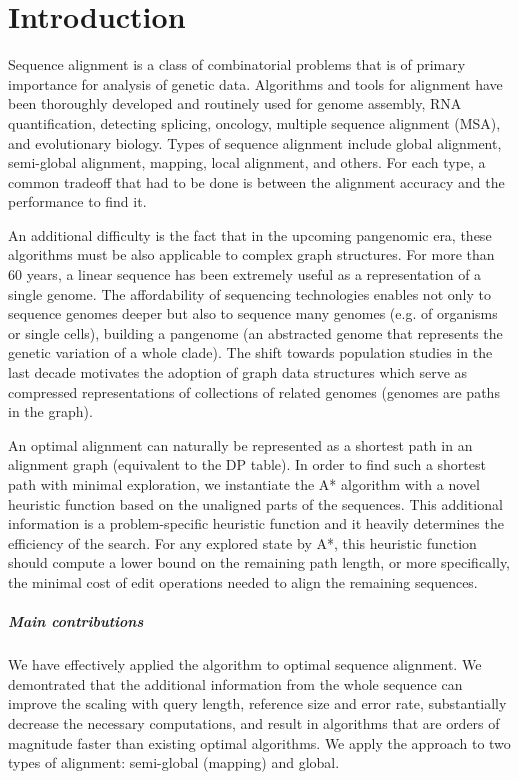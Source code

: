 \graphicspath{{\dir/}}

\chapter{Introduction} \label{ch:introduction}


Sequence alignment is a class of combinatorial problems that is of primary
importance for analysis of genetic data. Algorithms and tools for alignment have
been thoroughly developed and routinely used for genome assembly, RNA
quantification, detecting splicing, oncology, multiple sequence alignment (MSA),
and evolutionary biology. Types of sequence alignment include global alignment,
semi-global alignment, mapping, local alignment, and others. For each type, a
common tradeoff that had to be done is between the alignment accuracy and the
performance to find it.

An additional difficulty is the fact that in the
upcoming pangenomic era, these algorithms must be also applicable to complex
graph structures. For more than 60 years, a linear sequence has been extremely
useful as a representation of a single genome. The affordability of sequencing
technologies enables not only to sequence genomes deeper but also to sequence
many genomes (e.g. of organisms or single cells), building a pangenome (an
abstracted genome that represents the genetic variation of a whole clade). The
shift towards population studies in the last decade motivates the adoption of
graph data structures which serve as compressed representations of collections
of related genomes (genomes are paths in the graph).

An optimal alignment can naturally be represented as a shortest path in an
alignment graph (equivalent to the DP table). In order to find such a shortest
path with minimal exploration, we instantiate the A* algorithm with a novel
heuristic function based on the unaligned parts of the sequences. This
additional information is a problem-specific heuristic function and it heavily
determines the efficiency of the search. For any explored state by A*, this
heuristic function should compute a lower bound on the remaining path length, or
more specifically, the minimal cost of edit operations needed to align the
remaining sequences.

\paragraph{Main contributions}
We have effectively applied the \A algorithm to optimal sequence alignment. We
demontrated that the additional information from the whole sequence can improve
the scaling with query length, reference size and error rate, substantially
decrease the necessary computations, and result in algorithms that are orders of
magnitude faster than existing optimal algorithms. We apply the \A approach to
two types of alignment: semi-global (mapping) and global.





